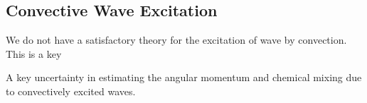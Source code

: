 {\color{purple}
\subsection{Convective Wave Excitation}
}

We do not have a satisfactory theory for the excitation of wave by convection. This is a key 

A key uncertainty in estimating the angular momentum and chemical mixing due to convectively excited waves.
